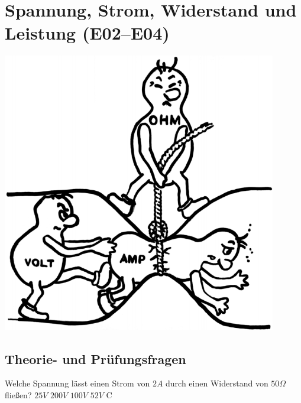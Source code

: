 \graphicspath{{e02-04_ET-Grundlagen/}}

\clearpage
\begin{minipage}{0.8\textwidth}
  \chapter{Spannung, Strom, Widerstand und Leistung (E02--E04)}
\end{minipage}
\begin{minipage}{0.2\textwidth}
  \includegraphics[width=0.9\textwidth]{URI.png}
  \footnotemark
\end{minipage}


\section{Theorie- und Prüfungsfragen}


{Welche Spannung lässt einen Strom von $2A$ durch einen Widerstand von
$50\Omega$ fließen?}%
{$25V$}%
{$200V$}%
{$100V$}%
{$52V$}%
{C}%

